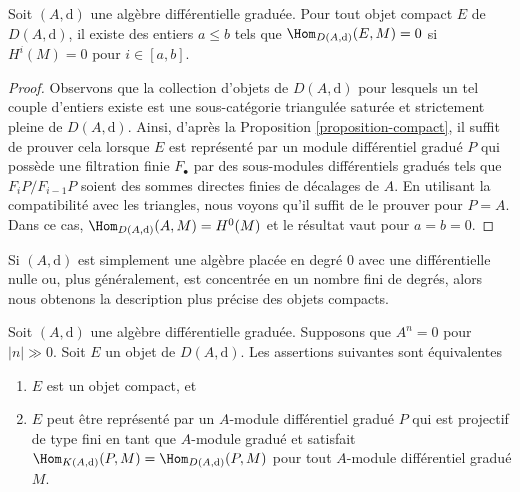 \begin{lemma}
\label{lemma-compact-implies-bounded}
Soit $(A, \text{d})$ une algèbre différentielle graduée. Pour tout objet compact
$E$ de $D(A, \text{d})$, il existe des entiers $a \leq b$ tels que $\Hom_{D(A,
\text{d})}(E, M) = 0$ si $H^i(M) = 0$ pour $i \in [a, b]$.
\end{lemma}

\begin{proof}
Observons que la collection d'objets de $D(A, \text{d})$ pour lesquels un tel
couple d'entiers existe est une sous-catégorie triangulée saturée et strictement
pleine de $D(A, \text{d})$. Ainsi, d'après la Proposition
\ref{proposition-compact}, il suffit de prouver cela lorsque $E$ est représenté
par un module différentiel gradué $P$ qui possède une filtration finie $F_\bullet$
par des sous-modules différentiels gradués tels que $F_iP/F_{i - 1}P$ soient des
sommes directes finies de décalages de $A$. En utilisant la compatibilité avec les
triangles, nous voyons qu'il suffit de le prouver pour $P = A$. Dans ce cas,
$\Hom_{D(A, \text{d})}(A, M) = H^0(M)$ et le résultat vaut pour $a = b = 0$.
\end{proof}

\noindent
Si $(A, \text{d})$ est simplement une algèbre placée en degré $0$ avec une
différentielle nulle ou, plus généralement, est concentrée en un nombre fini de
degrés, alors nous obtenons la description plus précise des objets compacts.

\begin{lemma}
\label{lemma-compact}
Soit $(A, \text{d})$ une algèbre différentielle graduée. Supposons que $A^n = 0$
pour $|n| \gg 0$. Soit $E$ un objet de $D(A, \text{d})$. Les assertions suivantes sont
équivalentes
\begin{enumerate}
\item $E$ est un objet compact, et
\item $E$ peut être représenté par un $A$-module différentiel gradué $P$ qui est
projectif de type fini en tant que $A$-module gradué et satisfait $\Hom_{K(A,
\text{d})}(P, M) = \Hom_{D(A, \text{d})}(P, M)$ pour tout $A$-module différentiel
gradué $M$.
\end{enumerate}
\end{lemma}

